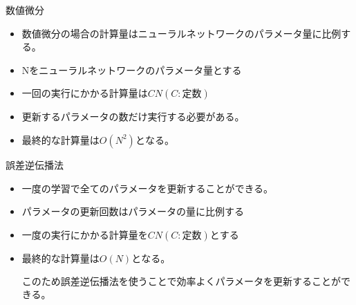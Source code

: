数値微分\\
\begin{itemize}
\item{数値微分の場合の計算量はニューラルネットワークのパラメータ量に比例する。}
\item{Nをニューラルネットワークのパラメータ量とする}
\item{$一回の実行にかかる計算量はCN(C:定数)$}
\item{更新するパラメータの数だけ実行する必要がある。}
\item{$最終的な計算量はO(N^2)となる。$}
\end{itemize}

誤差逆伝播法
\begin{itemize}
\item{一度の学習で全てのパラメータを更新することができる。}
\item{パラメータの更新回数はパラメータの量に比例する}
\item{$一度の実行にかかる計算量をCN(C:定数)とする$}
\item{$最終的な計算量はO(N)となる。$}

このため誤差逆伝播法を使うことで効率よくパラメータを更新することができる。
\end{itemize}
\begin{flushright}
\end{flushright}
